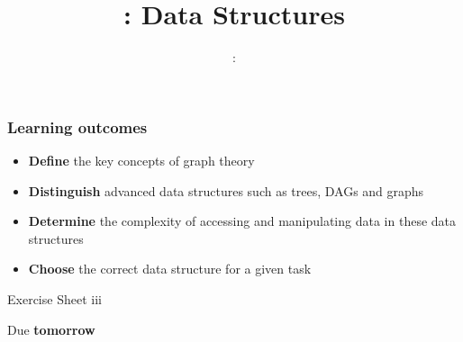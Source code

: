 \usepackage{../../beamerthemeFalmouthGamesAcademy}
\usepackage{multimedia}
\graphicspath{ {../../} }

\lstset{language=Python}

\usepackage[normalem]{ulem}
\usepackage{wasysym}

\usepackage{pdfpages}

\usetikzlibrary{arrows,automata,tikzmark,calc}

\usepackage{algpseudocode}
\usepackage{qtree}




\title{\sessionnumber: Data Structures}
\subtitle{\modulecode: \moduletitle}

\frame{\titlepage} 

\begin{frame}
	\frametitle{Learning outcomes}
	\begin{itemize}
		\item \textbf{Define} the key concepts of graph theory
		\item \textbf{Distinguish} advanced data structures such as trees, DAGs and graphs
		\item \textbf{Determine} the complexity of accessing and manipulating data in these data structures
		\item \textbf{Choose} the correct data structure for a given task
	\end{itemize}
\end{frame}

\begin{frame}{Exercise Sheet iii}
	\begin{center}
		Due \textbf{tomorrow}
	\end{center}
\end{frame}







